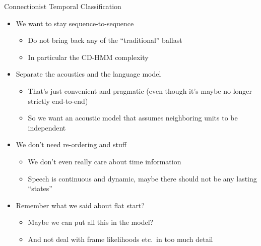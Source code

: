 
\begin{frame}{Connectionist Temporal Classification}
  \begin{itemize}
  \item We want to stay sequence-to-sequence
    \begin{itemize}
    \item Do not bring back any of the ``traditional'' ballast
    \item In particular the CD-HMM complexity
    \end{itemize}
  \item Separate the acoustics and the language model
    \begin{itemize}
      \item That's just convenient and pragmatic (even though it's maybe no longer strictly end-to-end)
      \item So we want an acoustic model that assumes neighboring units to be independent
    \end{itemize}
  \item We don't need re-ordering and stuff
    \begin{itemize}
    \item We don't even really care about time information
    \item Speech is continuous and dynamic, maybe there should not be any lasting ``states''
    \end{itemize}
  \item Remember what we said about flat start?
    \begin{itemize}
    \item Maybe we can put all this in the model?
    \item And not deal with frame likelihoods etc.\ in too much detail
    \end{itemize}
  \end{itemize}
\end{frame}

